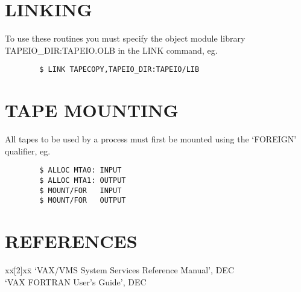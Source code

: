 \section {LINKING}

To use these routines you must specify the object module library
TAPEIO\_DIR:TAPEIO.OLB in the LINK command, eg.
\begin{verbatim}
        $ LINK TAPECOPY,TAPEIO_DIR:TAPEIO/LIB
\end{verbatim}
\section {TAPE MOUNTING}
All tapes to be used by a process must first be mounted using the `FOREIGN'
qualifier, eg.
\begin{verbatim}
        $ ALLOC MTA0: INPUT
        $ ALLOC MTA1: OUTPUT
        $ MOUNT/FOR   INPUT
        $ MOUNT/FOR   OUTPUT
\end{verbatim}
\section {REFERENCES}
\begin{tabbing}
xx\=[2]xx\=\kill
\>[1]\>`VAX/VMS System Services Reference Manual', DEC\\
\>[2]\>`VAX FORTRAN User's Guide', DEC
\end{tabbing}
\appendix
